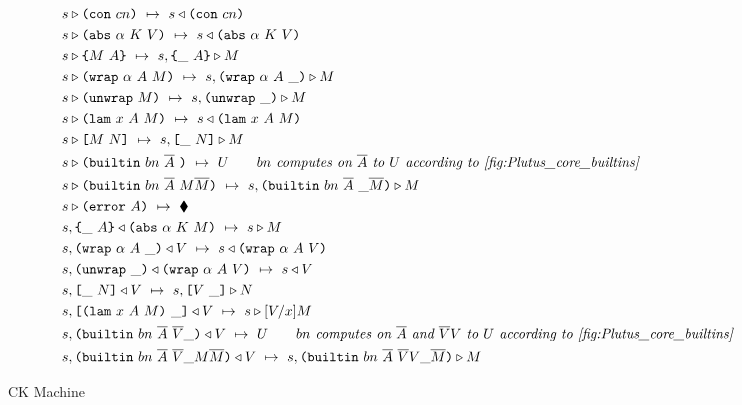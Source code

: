 \documentclass[../main.tex]{subfiles}
\begin{document}
\begin{figure*}[t]

    \begin{align*}
        &s \triangleright \texttt{(} \texttt{con} ~ cn \texttt{)} ~\mapsto~ s \triangleleft \texttt{(} \texttt{con} ~ cn \texttt{)}\\
        &s \triangleright \texttt{(} \texttt{abs} ~ \alpha ~ K ~ V \texttt{)} ~\mapsto~ s \triangleleft \texttt{(} \texttt{abs} ~ \alpha ~ K ~ V \texttt{)}\\
        &s \triangleright \texttt{\{}M ~ A\texttt{\}} ~\mapsto~ s, \texttt{\{}\_ ~ A\texttt{\}} \triangleright M\\
        &s \triangleright \texttt{(} \texttt{wrap} ~ \alpha ~ A ~ M \texttt{)} ~\mapsto~ s, \texttt{(} \texttt{wrap} ~ \alpha ~ A ~ \_ \texttt{)} \triangleright M\\
        &s \triangleright \texttt{(} \texttt{unwrap} ~ M \texttt{)} ~\mapsto~ s, \texttt{(} \texttt{unwrap} ~ \_ \texttt{)}{} \triangleright M\\
        &s \triangleright \texttt{(} \texttt{lam} ~ x ~ A ~ M \texttt{)} ~\mapsto~ s \triangleleft \texttt{(} \texttt{lam} ~ x ~ A ~ M \texttt{)}\\
        &s \triangleright \texttt{[} M ~ N \texttt{]} ~\mapsto~ s, \texttt{[} \_ ~ N \texttt{]} \triangleright M\\
        &s \triangleright \texttt{(} \texttt{builtin} ~ bn ~ \overline{A} ~  \texttt{)} ~\mapsto~ U \qquad \textit{$bn$ computes on $\overline{A}$ to $U$ according to \ref{fig:Plutus_core_builtins}}\\
        &s \triangleright \texttt{(} \texttt{builtin} ~ bn ~ \overline{A} ~ M \overline{M} \texttt{)} ~\mapsto~ s, \texttt{(} \texttt{builtin} ~ bn ~ \overline{A} ~  \_ \overline{M} \texttt{)} \triangleright M\\
        &s \triangleright \texttt{(} \texttt{error} ~ A \texttt{)} ~\mapsto~ \blacklozenge{}\\
        &s, \texttt{\{}\_ ~ A\texttt{\}} \triangleleft \texttt{(} \texttt{abs} ~ \alpha ~ K ~ M \texttt{)} ~\mapsto~ s \triangleright M\\
        &s, \texttt{(} \texttt{wrap} ~ \alpha ~ A ~ \_ \texttt{)} \triangleleft V ~\mapsto~ s \triangleleft \texttt{(} \texttt{wrap} ~ \alpha ~ A ~ V \texttt{)}\\
        &s, \texttt{(} \texttt{unwrap} ~ \_ \texttt{)}{} \triangleleft \texttt{(} \texttt{wrap} ~ \alpha ~ A ~ V \texttt{)} ~\mapsto~ s \triangleleft V\\
        &s, \texttt{[} \_ ~ N \texttt{]} \triangleleft V ~\mapsto~ s, \texttt{[} V ~ \_ \texttt{]} \triangleright N\\
        &s, \texttt{[} \texttt{(} \texttt{lam} ~ x ~ A ~ M \texttt{)} ~ \_ \texttt{]} \triangleleft V ~\mapsto~ s \triangleright [V/x]M\\
        &s, \texttt{(} \texttt{builtin} ~ bn ~ \overline{A} ~ \overline{V} \_  \texttt{)} \triangleleft V ~\mapsto~ U \qquad \textit{$bn$ computes on $\overline{A}$ and $\overline{V}V$ to $U$ according to \ref{fig:Plutus_core_builtins}}\\
        &s, \texttt{(} \texttt{builtin} ~ bn ~ \overline{A} ~ \overline{V} \_ M \overline{M} \texttt{)} \triangleleft V ~\mapsto~ s, \texttt{(} \texttt{builtin} ~ bn ~ \overline{A} ~ \overline{V} V \_ \overline{M} \texttt{)} \triangleright M\\
    \end{align*}

    \caption{CK Machine}
    \label{fig:Plutus_core_ck_machine}
\end{figure*}
\end{document}
